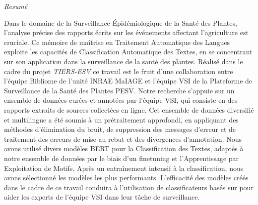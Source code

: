 \begin{center}
{\huge \emph{Resum\'e}}    
\end{center}


Dans le domaine de la Surveillance \'Epid\'emiologique de la Sant\'e des Plantes, l'analyse pr\'ecise des rapports \'ecrits sur les \'ev\'enements affectant l'agriculture est cruciale. 
Ce m\'emoire de ma\^itrise en Traitement Automatique des Langues exploite les capacit\'es de Classification Automatique des Textes, en se concentrant sur son application dans la surveillance de la sant\'e des plantes. R\'ealis\'e dans le cadre du projet \emph{TIERS-ESV} ce travail est le fruit d'une collaboration entre l'\'equipe Bibliome de l'unit\'e INRAE MaIAGE et l'\'equipe VSI de la Plateforme de Surveillance de la Sant\'e des Plantes PESV. Notre recherche s'appuie sur un ensemble de donn\'ees cur\'ees et annot\'ees par l'\'equipe VSI, qui consiste en des rapports extraits de sources collect\'ees en ligne. Cet ensemble de donn\'ees diversifi\'e et multilingue a \'et\'e soumis \`a un pr\'etraitement approfondi, en appliquant des m\'ethodes d'\'elimination du bruit, de suppression des messages d'erreur et de traitement des erreurs de mise au rebut et des divergences d'annotation. Nous avons utilis\'e divers mod\`eles BERT pour la Classification des Textes, adapt\'es \`a notre ensemble de donn\'ees par le biais d'un finetuning et l'Apprentissage par Exploitation de Motifs. %
Apr\`es un entra\^inement intensif \`a la classification, nous avons s\'electionn\'e les mod\`eles les plus performants. 
L'efficacit\'e des mod\`eles cr\'e\'es dans le cadre de ce travail conduira \`a l'utilisation de classificateurs bas\'es sur \BERT{} pour aider les experts de l'\'equipe VSI dans leur tâche de surveillance.
